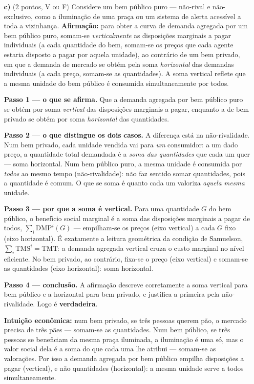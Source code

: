 \textbf{c)} (2 pontos, V ou F) Considere um bem público puro --- não-rival e não-exclusivo, como a iluminação de uma praça ou um sistema de alerta acessível a toda a vizinhança. \textbf{Afirmação:} para obter a curva de demanda agregada por um bem público puro, somam-se \emph{verticalmente} as disposições marginais a pagar individuais (a cada quantidade do bem, somam-se os preços que cada agente estaria disposto a pagar por aquela unidade), ao contrário de um bem privado, em que a demanda de mercado se obtém pela soma \emph{horizontal} das demandas individuais (a cada preço, somam-se as quantidades). A soma vertical reflete que a mesma unidade do bem público é consumida simultaneamente por todos.

\begin{solucao}
\textbf{Passo 1 --- o que se afirma.} Que a demanda agregada por bem público puro se obtém por soma \emph{vertical} das disposições marginais a pagar, enquanto a de bem privado se obtém por soma \emph{horizontal} das quantidades.

\textbf{Passo 2 --- o que distingue os dois casos.} A diferença está na não-rivalidade. Num bem privado, cada unidade vendida vai para \emph{um} consumidor: a um dado preço, a quantidade total demandada é a \emph{soma das quantidades} que cada um quer --- soma horizontal. Num bem público puro, a mesma unidade é consumida por \emph{todos} ao mesmo tempo (não-rivalidade): não faz sentido somar quantidades, pois a quantidade é comum. O que se soma é quanto cada um valoriza \emph{aquela mesma} unidade.

\textbf{Passo 3 --- por que a soma é vertical.} Para uma quantidade $G$ do bem público, o benefício social marginal é a soma das disposições marginais a pagar de todos, $\sum_i \text{DMP}^i(G)$ --- empilham-se os preços (eixo vertical) a cada $G$ fixo (eixo horizontal). É exatamente a leitura geométrica da condição de Samuelson, $\sum_i \text{TMS}^i=\text{TMT}$: a demanda agregada vertical cruza o custo marginal no nível eficiente. No bem privado, ao contrário, fixa-se o preço (eixo vertical) e somam-se as quantidades (eixo horizontal): soma horizontal.

\textbf{Passo 4 --- conclusão.} A afirmação descreve corretamente a soma vertical para bem público e a horizontal para bem privado, e justifica a primeira pela não-rivalidade. Logo é \textbf{verdadeira}.

\textbf{Intuição econômica:} num bem privado, se três pessoas querem pão, o mercado precisa de três pães --- somam-se as quantidades. Num bem público, se três pessoas se beneficiam da mesma praça iluminada, a iluminação é uma só, mas o valor social dela é a soma do que cada uma lhe atribui --- somam-se as valorações. Por isso a demanda agregada por bem público empilha disposições a pagar (vertical), e não quantidades (horizontal): a mesma unidade serve a todos simultaneamente.
\end{solucao}

